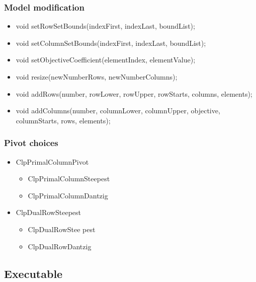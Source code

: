 \documentclass{beamer}
\begin{document}
\begin{frame}
  \frametitle{Model modification}
  \begin{itemize}
  \item void setRowSetBounds(indexFirst,
                             indexLast,
                             boundList);
  \item void setColumnSetBounds(indexFirst,
                                indexLast,
                                boundList);
  \item void setObjectiveCoefficient(elementIndex, elementValue);
  \item void resize(newNumberRows, newNumberColumns);
  \item void addRows(number, rowLower,
                     rowUpper,
                     rowStarts, columns,
                     elements);
  \item void addColumns(number, columnLower,
                        columnUpper,
                        objective,
                        columnStarts, rows,
                        elements);                                            
  \end{itemize}
\end{frame}

{\Large
\begin{frame}
  \frametitle{Pivot choices}
  \begin{itemize}
  \item ClpPrimalColumnPivot
    {\Large
    \begin{itemize}
    \item ClpPrimalColumnSteepest
    \item ClpPrimalColumnDantzig
    \end{itemize}
    }
  \item ClpDualRowSteepest
    {\Large
    \begin{itemize}
    \item ClpDualRowStee  pest
    \item ClpDualRowDantzig
    \end{itemize}
    }
  \end{itemize}
\end{frame}
}

\subsection{Executable}
\end{document}
